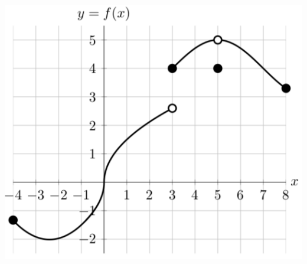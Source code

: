 \documentclass[11pt]{exam}
\begin{document}
\begin{questions}
\begin{center}
  \includegraphics[scale=0.4]{Figures/Exam2W2018Problem5}
\end{center}


\end{questions}
\end{document}
